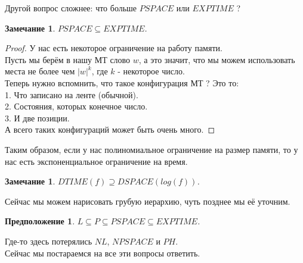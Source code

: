 \documentclass{beamer}
\theoremstyle{plain}
\newtheorem{conj}[thm]{Предположение}
\newtheorem{rmk}[thm]{Замечание}
\theoremstyle{definition}
\begin{document}
\begin{frame}
    Другой вопрос сложнее: что больше $PSPACE$ или $EXPTIME$ ?
    \begin{rmk}
         $PSPACE \subseteq EXPTIME$.
    \end{rmk}
    \begin{proof}
        У нас есть некоторое ограничение на работу памяти. \\
        Пусть мы берём в нашу МТ слово $w$, а это значит, что мы можем использовать места не более чем $|w|^k$, где $k$ - некоторое число. \\
        Теперь нужно вспомнить, что такое конфигурация МТ ?
        Это то: \\
        1. Что записано на ленте (обычной). \\
        2. Состояния, которых конечное число. \\
        3. И две позиции. \\
        А всего таких конфигураций может быть очень много.
    \end{proof}
\end{frame}

\begin{frame}
    Таким образом, если у нас полиномиальное ограничение на размер памяти, то у нас
    есть экспоненциальное ограничение на время.
    \begin{rmk}
        $DTIME(f) \supseteq DSPACE(log(f))$.
    \end{rmk}
    Сейчас мы можем нарисовать грубую иерархию, чуть позднее мы её уточним.
    \begin{conj}
        $L \subseteq P \subseteq PSPACE \subseteq EXPTIME$.
    \end{conj}
    Где-то здесь потерялись $NL$, $NPSPACE$ и $PH$. \\
    Сейчас мы постараемся на все эти вопросы ответить.
\end{frame}
\end{document}
